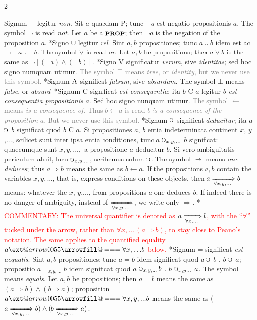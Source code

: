 \documentclass{book}
\makeatletter
\newcommand{\C}{\mathop{\sbox0{$\displaystyle$$\reflectbox{C}$} %
\raisebox{-\height+\ht0-0.05cm}[\ht0][\dp0]{\scalebox{0.8}[0.8]{\copy0}}}\displaylimits} %
\newcommand{\abs}{\mathop{\rotatebox[origin=c]{180}{V}}}
\newcommand{\prop}{\mathord{\text{{\footnotesize \textbf{PROP}}}}}
\renewcommand{\rightarrow}{\Rightarrow}
\renewcommand{\xrightarrow}{\xRightarrow}
\newcommand*{\Relbarfill@}{\arrowfill@\Relbar\Relbar\Relbar}
\newcommand*{\xeq}[2][]{\ext@arrow 0055\Relbarfill@{#1}{#2}}
\newcommand\irrelevant[1]{\textcolor{gray}{#1}}
\newcommand\commentary[1]{\textcolor{red}{COMMENTARY: #1}}
\newenvironment{translateTwoCol}
               { %
                 \columnratio{0.5, 0.5}
                 \begin{paracol}{2}
                 \newcommand{\LAT}{\switchcolumn[0]*}
                 \newcommand{\ENG}{\switchcolumn[1]}
               }
               { %
                 \let\ENG\undefined
                 \let\LAT\undefined
                 \end{paracol}
               }
\makeatother
\begin{document}
\begin{translateTwoCol}
Signum $-$ legitur \emph{non}. Sit $a$ quaedam $\text{P}$; tunc $-a$ est negatio propositionis $a$.
\ENG The symbol $\neg$ is read \emph{not}. Let $a$ be a $\prop$; then $\neg a$ is the negation of the proposition $a$.
\LAT Signo $\cup$ legitur \emph{vel}. Sint $a,b$ propositiones; tunc $a \cup b$ idem est ac $-:-a$ $.$ $-b$.
\ENG The symbol $\vee$ is read \emph{or}. Let $a,b$ be propositions; then $a \vee b$ is the same as $\neg[(\neg a) \wedge (\neg b)]$.
\LAT \text{[}Signo V significatur \emph{verum}, sive \emph{identitas}; sed hoc signo numquam utimur\text{]}.  
\ENG \irrelevant{The symbol $\top$  means \emph{true}, or \emph{identity}, but we never use this symbol.}
\LAT Signum  $\abs$ significat \emph{falsum}, sive \emph{absurdum}.
\ENG The symbol $\bot$ means \emph{false}, or \emph{absurd}.
\LAT \text{[}Signum C significat \emph{est consequentia}; ita $b$ C $a$ legitur $b$ \emph{est consequentia propositionis} $a$. Sed hoc signo nunquam utimur\text{]}.
\ENG \irrelevant{The symbol $\leftarrow$ means \emph{is a consequence of}. Thus $b \leftarrow a$ is read $b$ \emph{is a consequence of the proposition} $a$. But we never use this symbol.}
\LAT Signum $\C$ significat \emph{deducitur}; ita $a$ $\C$ $b$ significat quod $b$ C $a$. Si propositiones $a$, $b$ entia indeterminata continent $x$, $y$,..., scilicet sunt inter ipsa entia conditiones, tunc $a$ $\C_{x,y,...}$ $b$ significat: quaecumque sunt $x,y,...,$ a propositione $a$ deducitur $b$. Si vero ambiguitatis periculum absit, loco $\C_{x,y,...}$, scribemus solum $\C$.
\ENG The symbol $\rightarrow$ means \emph{one deduces}; thus $a \rightarrow b$ means the same as $b \leftarrow a$. If the propositions $a,b$ contain the variables $x,y,...$, that is, express conditions on these objects, then $a \xrightarrow[\forall x,y,...]{} b$ means: whatever the $x$, $y$,..., from propositions $a$ one deduces $b$. If indeed there is no danger of ambiguity, instead of $\xrightarrow[\forall x,y,...]{}$, we write only $\rightarrow$.
\LAT
\ENG
\commentary{The universal quantifier is denoted as $a \xrightarrow[\forall x,\ldots]{} b$, with the ``$\forall$'' tucked under the arrow, rather than $\forall x,\ldots\,(a \rightarrow b)$, to stay close to Peano's notation.  The same applies to the quantified equality $a \xeq[\forall x,\ldots]{} b$ below.}
\LAT Signum = significat \emph{est aequalis}. Sint $a,b$ propositiones; tunc $a=b$ idem significat quod $a$ $\C$ $b$ $.$ $b$ $\C$ $a$; propositio $a=_{x,y,...} b$ idem significat quod $a$ $ \C_{x,y,...} b$ $.$ $b$ $\C_{x,y,...} a$.
\ENG The symbol = means \emph{equals}. Let $a,b$ be propositions; then $a=b$ means the same as $(a \rightarrow b) \wedge (b \rightarrow a)$; proposition $a\xeq[\forall x,y,...]{} b$ means the same as ($a \xrightarrow[\forall x,y,...]{} b) \wedge (b \xrightarrow[\forall x,y,...]{} a)$.
\end{translateTwoCol}
\end{document}
